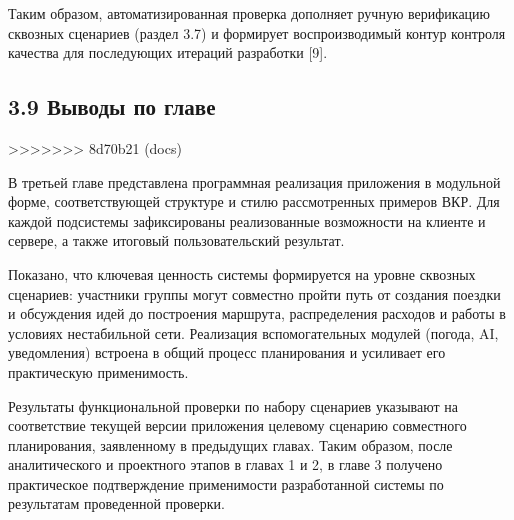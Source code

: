 Таким образом, автоматизированная проверка дополняет ручную верификацию сквозных сценариев (раздел 3.7) и формирует воспроизводимый контур контроля качества для последующих итераций разработки [9].

\subsection{3.9 Выводы по главе}
>>>>>>> 8d70b21 (docs)

В третьей главе представлена программная реализация приложения в модульной форме, соответствующей структуре и стилю рассмотренных примеров ВКР. Для каждой подсистемы зафиксированы реализованные возможности на клиенте и сервере, а также итоговый пользовательский результат.

Показано, что ключевая ценность системы формируется на уровне сквозных сценариев: участники группы могут совместно пройти путь от создания поездки и обсуждения идей до построения маршрута, распределения расходов и работы в условиях нестабильной сети. Реализация вспомогательных модулей (погода, AI, уведомления) встроена в общий процесс планирования и усиливает его практическую применимость.

Результаты функциональной проверки по набору сценариев указывают на соответствие текущей версии приложения целевому сценарию совместного планирования, заявленному в предыдущих главах. Таким образом, после аналитического и проектного этапов в главах 1 и 2, в главе 3 получено практическое подтверждение применимости разработанной системы по результатам проведенной проверки.
